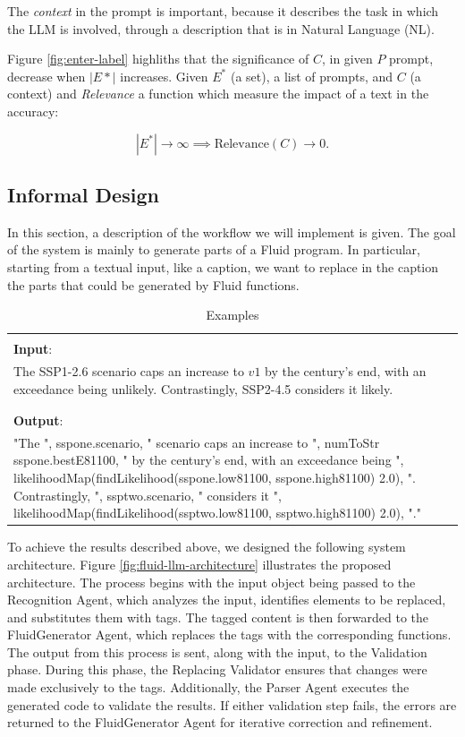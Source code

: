 The \textit{context} in the prompt is important, because it describes the task in which the LLM is involved, through a description that is in Natural Language (NL).

Figure \ref{fig:enter-label} highliths that the significance of $C$, in given $P$ prompt, decrease when $|E*|$ increases. Given \( E^* \) (a set), a list of prompts, and \( C \) (a context) and \textit{Relevance} a function which measure the impact of a text in the accuracy:

\[
|E^*| \to \infty \implies \text{Relevance}(C) \to 0.
\]

\subsection{Informal Design}

In this section, a description of the workflow we will implement is given. The goal of the system is mainly to generate parts of a Fluid program. In particular, starting from a textual input, like a caption, we want to replace in the caption the parts that could be generated by Fluid functions.

\begin{table}[!ht]
    \centering
    \caption{Examples}
    \begin{tabular}{p{13cm}}
    \hline
    \hline
    \\\textbf{Input}:\\
    The SSP1-2.6 scenario caps an increase to $v1$ by the century's end, with an exceedance being unlikely. Contrastingly, SSP2-4.5 considers it likely.\\\\
    \hline
    \\\textbf{Output}:\\
    "The ", sspone.scenario, " scenario caps an increase to ", numToStr sspone.bestE81100, " by the century's end, with an exceedance being ", likelihoodMap(findLikelihood(sspone.low81100, sspone.high81100) 2.0), ". Contrastingly, ", ssptwo.scenario, " considers it ", likelihoodMap(findLikelihood(ssptwo.low81100, ssptwo.high81100) 2.0), "."\\
    \hline
    \hline
    \end{tabular}
\end{table}

To achieve the results described above, we designed the following system architecture. Figure \ref{fig:fluid-llm-architecture} illustrates the proposed architecture.
The process begins with the input object being passed to the Recognition Agent, which analyzes the input, identifies elements to be replaced, and substitutes them with tags. The tagged content is then forwarded to the FluidGenerator Agent, which replaces the tags with the corresponding functions.
The output from this process is sent, along with the input, to the Validation phase. During this phase, the Replacing Validator ensures that changes were made exclusively to the tags. Additionally, the Parser Agent executes the generated code to validate the results.
If either validation step fails, the errors are returned to the FluidGenerator Agent for iterative correction and refinement.

